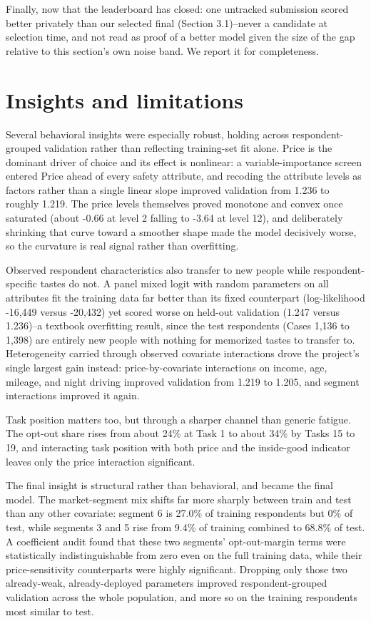 \documentclass[
  9.5pt,
]{article}
\begin{document}
Finally, now that the leaderboard has closed: one untracked submission
scored better privately than our selected final (Section 3.1)--never a
candidate at selection time, and not read as proof of a better model
given the size of the gap relative to this section's own noise band. We
report it for completeness.

\section{Insights and limitations}\label{insights-and-limitations}

Several behavioral insights were especially robust, holding across
respondent-grouped validation rather than reflecting training-set fit
alone. Price is the dominant driver of choice and its effect is
nonlinear: a variable-importance screen entered Price ahead of every
safety attribute, and recoding the attribute levels as factors rather
than a single linear slope improved validation from 1.236 to roughly
1.219. The price levels themselves proved monotone and convex once
saturated (about -0.66 at level 2 falling to -3.64 at level 12), and
deliberately shrinking that curve toward a smoother shape made the model
decisively worse, so the curvature is real signal rather than
overfitting.

Observed respondent characteristics also transfer to new people while
respondent-specific tastes do not. A panel mixed logit with random
parameters on all attributes fit the training data far better than its
fixed counterpart (log-likelihood -16,449 versus -20,432) yet scored
worse on held-out validation (1.247 versus 1.236)--a textbook
overfitting result, since the test respondents (Cases 1,136 to 1,398)
are entirely new people with nothing for memorized tastes to transfer
to. Heterogeneity carried through observed covariate interactions drove
the project's single largest gain instead: price-by-covariate
interactions on income, age, mileage, and night driving improved
validation from 1.219 to 1.205, and segment interactions improved it
again.

Task position matters too, but through a sharper channel than generic
fatigue. The opt-out share rises from about 24\% at Task 1 to about 34\%
by Tasks 15 to 19, and interacting task position with both price and the
inside-good indicator leaves only the price interaction significant.

The final insight is structural rather than behavioral, and became the
final model. The market-segment mix shifts far more sharply between
train and test than any other covariate: segment 6 is 27.0\% of training
respondents but 0\% of test, while segments 3 and 5 rise from 9.4\% of
training combined to 68.8\% of test. A coefficient audit found that
these two segments' opt-out-margin terms were statistically
indistinguishable from zero even on the full training data, while their
price-sensitivity counterparts were highly significant. Dropping only
those two already-weak, already-deployed parameters improved
respondent-grouped validation across the whole population, and more so
on the training respondents most similar to test.
\end{document}
